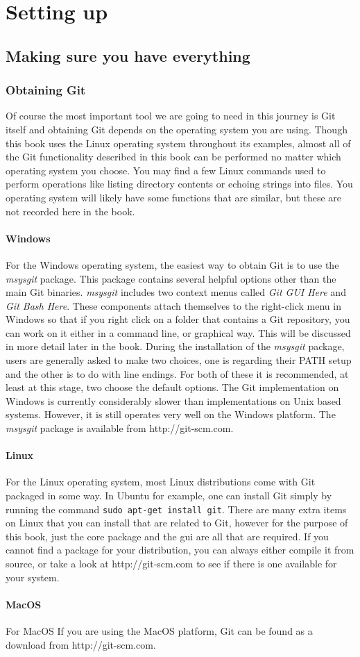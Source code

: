 \cleardoublepage
\chapter{Setting up}
\section{Making sure you have everything}
\subsection{Obtaining Git}
Of course the most important tool we are going to need in this journey is Git itself and obtaining Git depends on the operating system you are using.
Though this book uses the Linux operating system throughout its examples,
almost all of the Git functionality described in this book can be performed no matter which operating system you choose.
You may find a few Linux commands used to perform operations like listing directory contents or echoing strings into files.
You operating system will likely have some functions that are similar, but these are not recorded here in the book.

\subsubsection{Windows}
For the Windows operating system, the easiest way to obtain Git is to use the \emph{msysgit} package.
This package contains several helpful options other than the main Git binaries.
\emph{msysgit} includes two context menus called \emph{Git GUI Here} and \emph{Git Bash Here}.
These components attach themselves to the right-click menu in Windows so that if you right click on a folder that contains a Git repository,
you can work on it either in a command line, or graphical way.
This will be discussed in more detail later in the book.
During the installation of the \emph{msysgit} package, users are generally asked to make two choices, one is regarding their PATH setup and the other is to do with line endings.
For both of these it is recommended, at least at this stage, two choose the default options.
The Git implementation on Windows is currently considerably slower than implementations on Unix based systems.
However, it is still operates very well on the Windows platform.
The \emph{msysgit} package is available from http://git-scm.com.

\subsubsection{Linux}
For the Linux operating system, most Linux distributions come with Git packaged in some way.
In Ubuntu for example, one can install Git simply by running the command \texttt{sudo apt-get install git}.
There are many extra items on Linux that you can install that are related to Git, however for the purpose of this book, just the core package and the gui are all that are required.
If you cannot find a package for your distribution, you can always either compile it from source, or take a look at http://git-scm.com to see if there is one available for your system.

\subsubsection{MacOS}
For MacOS
If you are using the MacOS platform, Git can be found as a download from http://git-scm.com.
